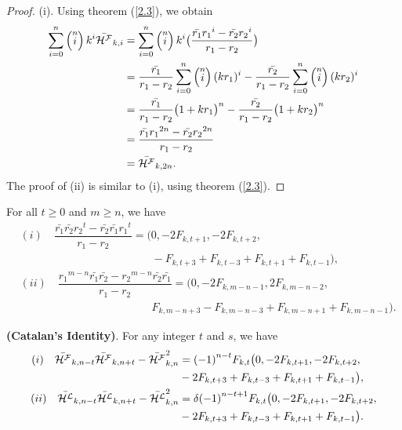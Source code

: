 \begin{proof}(i).
Using theorem (\ref{2.3}), we obtain
\begin{align*}
\sum\limits_{i=0}^{n}\left( \stackrel{n}{i}\right) k^{i}\bar{{\mathcal{H^F}}}_{k,i}&=\sum\limits_{i=0}^{n}\left( \stackrel{n}{i}\right) k^{i}\big(\dfrac{\bar{r_1}{{r_1}}^{i}-\bar{r_2}{r_{2}}^{i}}{r_1-r_2}\big)\\
&=\dfrac{\bar{r_1}}{r_1-r_2}\sum\limits_{i=0}^{n}\left( \stackrel{n}{i}\right) (kr_1)^{i}-\dfrac{\bar{r_2}}{r_1-r_2}\sum\limits_{i=0}^{n}\left( \stackrel{n}{i}\right) (kr_2)^{i}\\
&=\dfrac{\bar{r_1}}{r_1-r_2}\big(1+kr_1\big)^n-\dfrac{\bar{r_2}}{r_1-r_2}\big(1+kr_2\big)^n\\
&=\dfrac{\bar{r_1}{{r_1}}^{2n}-\bar{r_2}{r_{2}}^{2n}}{r_1-r_2}\\
&=\bar{{\mathcal{H^F}}}_{k,2n}.
\end{align*}
The proof of (ii) is similar to (i), using theorem (\ref{2.3}).
\end{proof}
\begin{lemma}\label{2.8l}
For all $t\geqslant 0$ and $m\geqslant n$, we have 
\begin{align*}
&(i)\quad\dfrac{\bar{r_1}\bar{r_2}{r_2}^{t}-\bar{r_2}\bar{r_1}{r_1}^{t}}{r_1-r_2}=\big(0, -2F_{k,t+1}, -2F_{k,t+2},  \\&\qquad\qquad\qquad\qquad\qquad\qquad-F_{k,t+3}+F_{k,t-3}+F_{k,t+1}+F_{k,t-1}\big),\\
&(ii)\quad \dfrac{{r_1}^{m-n}\bar{r_1}\bar{r_2}-{r_2}^{m-n}\bar{r_2}\bar{r_1}}{r_1-r_2}=\big(0, -2F_{k,m-n-1}, 2F_{k,m-n-2}, \\&\qquad\qquad\qquad\qquad\qquad\qquad F_{k,m-n+3}-F_{k,m-n-3}+F_{k,m-n+1}+F_{k,m-n-1}\big).
\end{align*}
\end{lemma}
\begin{theorem}\textbf{(Catalan's Identity)}. For any integer $t$ and $s$, we have \label{2.9t}
\begin{align*}
(i)\quad\bar{{\mathcal{H^F}}}_{k,n-t}\bar{{\mathcal{H^F}}}_{k,n+t}-{\bar{{\mathcal{H^F}}}_{k,n}}^2&={(-1)}^{n-t}{{F}_{k,t}}\big(0, -2F_{k,t+1},-2F_{k,t+2},\\& -2F_{k,t+3}+F_{k,t-3}+F_{k,t+1}+F_{k,t-1}\big),\\
(ii)\quad\bar{{\mathcal{H^L}}}_{k,n-t}\bar{{\mathcal{H^L}}}_{k,n+t}-{\bar{{\mathcal{H^L}}}_{k,n}}^2&=\delta{(-1)}^{n-t+1}{{F}_{k,t}}\big(0, -2F_{k,t+1},-2F_{k,t+2}, \\&-2F_{k,t+3}+F_{k,t-3}+F_{k,t+1}+F_{k,t-1}\big).
\end{align*}
\end{theorem}
